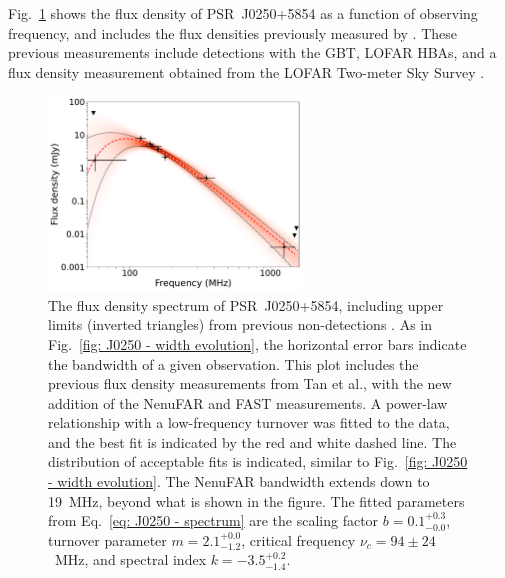Fig.~\ref{fig: J0250 - spectrum} shows the flux density of PSR~J0250+5854 as a function of observing frequency, and includes the flux densities previously measured by \citet{TBC+2018}. These previous measurements include detections with the GBT, LOFAR HBAs, and a flux density measurement obtained from the LOFAR Two-meter Sky Survey \citep[LoTSS;][]{SRB+2017}.
\begin{figure}
    \begin{center}
        \includegraphics[width=0.6\textwidth]{Figures/J0250/spectral_index_turnover}
        \caption[The radio frequency flux density spectrum of PSR~J0250+5854]{The flux density spectrum of PSR~J0250+5854, including upper limits (inverted triangles) from previous non-detections \citep{TBC+2018}. As in Fig.~\ref{fig: J0250 - width evolution}, the horizontal error bars indicate the bandwidth of a given observation. This plot includes the previous flux density measurements from Tan et al., with the new addition of the NenuFAR and FAST measurements. A power-law relationship with a low-frequency turnover was fitted to the data, and the best fit is indicated by the red and white dashed line. The distribution of acceptable fits is indicated, similar to Fig.~\ref{fig: J0250 - width evolution}. The NenuFAR bandwidth extends down to 19~MHz, beyond what is shown in the figure. The fitted parameters from Eq.~\eqref{eq: J0250 - spectrum} are the scaling factor $b = 0.1^{+0.3}_{-0.0}$, turnover parameter $m = 2.1^{+0.0}_{-1.2}$, critical frequency $\nu_c = 94\pm24$~MHz, and spectral index $k = -3.5^{+0.2}_{-1.4}$.}
        \label{fig: J0250 - spectrum}
    \end{center}
\end{figure}
